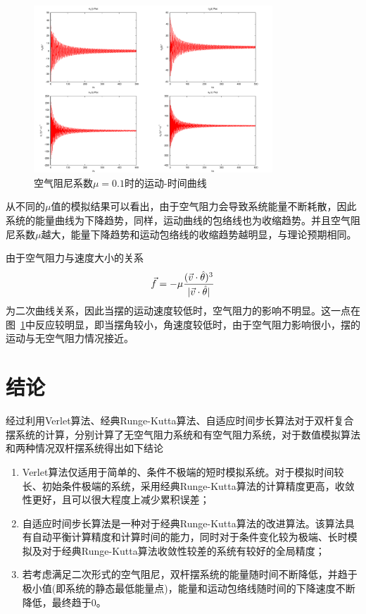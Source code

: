 \documentclass[a4paper,12pt,titlepage]{article}
\begin{document}
\begin{figure}[H]
\centering
\includegraphics[width=0.8\textwidth]{./rss2move.pdf}
\caption[Caption for LOF]{空气阻尼系数$\mu=0.1$时的运动-时间曲线}
\label{fig:rss2move}
\end{figure}

从不同的$\mu$值的模拟结果可以看出，由于空气阻力会导致系统能量不断耗散，因此系统的能量曲线为下降趋势，同样，运动曲线的包络线也为收缩趋势。并且空气阻尼系数$\mu$越大，能量下降趋势和运动包络线的收缩趋势越明显，与理论预期相同。

由于空气阻力与速度大小的关系
\begin{equation}
	\vec{f}=-\mu \frac{(\vec{v}\cdot\hat{\theta})^3}{|\vec{v}\cdot\hat{\theta}|} \notag
\end{equation}
为二次曲线关系，因此当摆的运动速度较低时，空气阻力的影响不明显。这一点在图~\ref{fig:rss2move}中反应较明显，即当摆角较小，角速度较低时，由于空气阻力影响很小，摆的运动与无空气阻力情况接近。

\section{结论}
经过利用Verlet算法、经典Runge-Kutta算法、自适应时间步长算法对于双杆复合摆系统的计算，分别计算了无空气阻力系统和有空气阻力系统，对于数值模拟算法和两种情况双杆摆系统得出如下结论
\begin{enumerate}
	\item Verlet算法仅适用于简单的、条件不极端的短时模拟系统。对于模拟时间较长、初始条件极端的系统，采用经典Runge-Kutta算法的计算精度更高，收敛性更好，且可以很大程度上减少累积误差；
	\item 自适应时间步长算法是一种对于经典Runge-Kutta算法的改进算法。该算法具有自动平衡计算精度和计算时间的能力，同时对于条件变化较为极端、长时模拟及对于经典Runge-Kutta算法收敛性较差的系统有较好的全局精度；
	\item 若考虑满足二次形式的空气阻尼，双杆摆系统的能量随时间不断降低，并趋于极小值(即系统的静态最低能量点)，能量和运动包络线随时间的下降速度不断降低，最终趋于0。
\end{enumerate}
\end{document}
